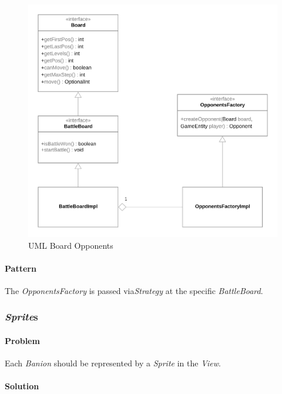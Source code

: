 \documentclass[12pt, a4paper]{report}
\theoremstyle{definition}
\begin{document}
            \begin{figure}[ht]
            \centering{}
            \includegraphics[width=\textwidth]{opponents_creation}
            \caption{UML Board Opponents}
            \end{figure}

            \paragraph{Pattern}

            The \emph{OpponentsFactory} is passed via\emph{Strategy} at the specific \emph{BattleBoard}.
            
        \pagebreak

        \subsubsection{\emph{Sprite}s}

            \paragraph{Problem}

            Each \emph{Banion} should be represented by a \emph{Sprite} in the \emph{View}.

            \paragraph{Solution}
\end{document}
